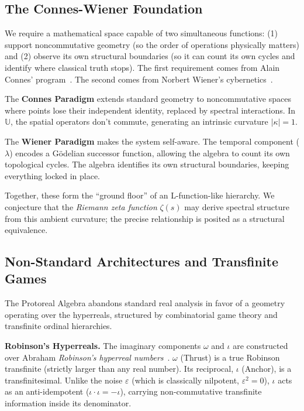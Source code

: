 \documentclass[12pt,oneside]{article}
\theoremstyle{principia}
\theoremstyle{definition}
\theoremstyle{remark}
\providecommand{\UU}{\mathbb{U}}
\providecommand{\eps}{\varepsilon}
\providecommand{\lam}{\lambda}
\providecommand{\kap}{\kappa}
\begin{document}
\subsection{The Connes-Wiener Foundation}\label{sec:connes-wiener}

We require a mathematical space capable of two simultaneous functions: (1) support noncommutative geometry (so the order of operations physically matters) and (2) observe its own structural boundaries (so it can count its own cycles and identify where classical truth stops). The first requirement comes from Alain Connes' program~\cite{connes}. The second comes from Norbert Wiener's cybernetics~\cite{wiener}.

The \textbf{Connes Paradigm} extends standard geometry to noncommutative spaces where points lose their independent identity, replaced by spectral interactions. In $\UU$, the spatial operators don't commute, generating an intrinsic curvature $|\kap| = 1$.

The \textbf{Wiener Paradigm} makes the system self-aware. The temporal component ($\lam$) encodes a G\"odelian successor function, allowing the algebra to count its own topological cycles. The algebra identifies its own structural boundaries, keeping everything locked in place.

Together, these form the ``ground floor'' of an L-function-like hierarchy. We conjecture that the \emph{Riemann zeta function} $\zeta(s)$ may derive spectral structure from this ambient curvature; the precise relationship is posited as a structural equivalence.

\subsection{Non-Standard Architectures and Transfinite Games}

The Protoreal Algebra abandons standard real analysis in favor of a geometry operating over the hyperreals, structured by combinatorial game theory and transfinite ordinal hierarchies.

\textbf{Robinson's Hyperreals.} The imaginary components $\omega$ and $\iota$ are constructed over Abraham \emph{Robinson's hyperreal numbers}~\cite{robinson}. $\omega$ (Thrust) is a true Robinson transfinite (strictly larger than any real number). Its reciprocal, $\iota$ (Anchor), is a transfinitesimal. Unlike the noise $\eps$ (which is classically nilpotent, $\eps^2 = 0$), $\iota$ acts as an anti-idempotent ($\iota \cdot \iota = -\iota$), carrying non-commutative transfinite information inside its denominator.
\end{document}
